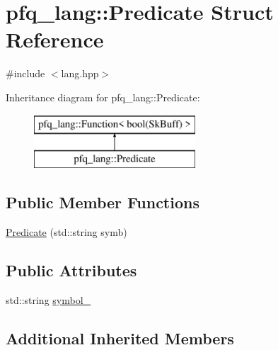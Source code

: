 \hypertarget{structpfq__lang_1_1Predicate}{\section{pfq\+\_\+lang\+:\+:Predicate Struct Reference}
\label{structpfq__lang_1_1Predicate}
}


{\ttfamily \#include $<$lang.\+hpp$>$}

Inheritance diagram for pfq\+\_\+lang\+:\+:Predicate\+:\begin{figure}[H]
\begin{center}
\leavevmode
\includegraphics[height=2.000000cm]{structpfq__lang_1_1Predicate}
\end{center}
\end{figure}
\subsection*{Public Member Functions}
\begin{DoxyCompactItemize}
\item 
\hyperlink{structpfq__lang_1_1Predicate_ab91af9569c514d8ec1f8c5c75d74b0c5}{Predicate} (std\+::string symb)
\end{DoxyCompactItemize}
\subsection*{Public Attributes}
\begin{DoxyCompactItemize}
\item 
std\+::string \hyperlink{structpfq__lang_1_1Predicate_a44004d3c8071b374fe4cd1838deb28a3}{symbol\+\_\+}
\end{DoxyCompactItemize}
\subsection*{Additional Inherited Members}


